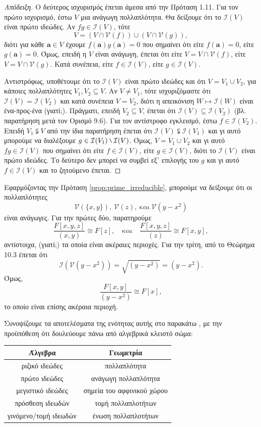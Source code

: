 \documentclass[12pt,a4paper,reqno]{amsart}
\theoremstyle{definition}
\theoremstyle{remark}
\numberwithin{theorem}{section}
\numberwithin{exercise}{section}
\numberwithin{equation}{section}
\newcommand{\iI}{\mathcal{I}}
\newcommand{\vV}{\mathcal{V}}
\newcommand{\bfa}{\pmb{a}}
\newcommand{\mysetminusD}{\hbox{\tikz{\draw[line width=0.6pt,line cap=round] (3pt,0) -- (0,6pt);}}}
\newcommand{\mysetminusT}{\mysetminusD}
\newcommand{\mysetminusS}{\hbox{\tikz{\draw[line width=0.45pt,line cap=round] (2pt,0) -- (0,4pt);}}}
\newcommand{\mysetminusSS}{\hbox{\tikz{\draw[line width=0.4pt,line cap=round] (1.5pt,0) -- (0,3pt);}}}
\newcommand{\sm}{\mathbin{\mathchoice{\mysetminusD}{\mysetminusT}{\mysetminusS}{\mysetminusSS}}}
\begin{document}
\begin{proof}[Απόδειξη]
  Ο δεύτερος ισχυρισμός έπεται άμεσα από την Πρόταση 1.11. Για τον πρώτο ισχυρι\-σμό, έστω $V$ μια ανάγωγη πολλαπλότητα. Θα δείξουμε ότι το $\iI(V)$ είναι πρώτο ιδεώδες. Αν $fg \in \iI(V)$, τότε 
  \[
  V = \left(
    V \cap \vV(f)
  \right) \cup \left(
    V \cap \vV(g)
  \right),
  \]
  διότι για κάθε $\bfa \in V$ έχουμε $f(\bfa)g(\bfa) = 0$ που σημαίνει ότι είτε $f(\bfa) = 0$, είτε $g(\bfa) = 0$. Όμως, επειδή η $V$ είναι ανάγωγη, έπεται ότι είτε $V = V \cap \vV(f)$, είτε $V = V \cap \vV(g)$. Κατά συνέπεια, είτε $f \in \iI(V)$, είτε $g \in \iI(V)$.
  
  Αντιστρόφως, υποθέτουμε ότι το $\iI(V)$ είναι πρώτο ιδεώδες και ότι $V = V_1 \cup V_2$, για κάποιες πολλαπλότητες $V_1, V_2 \subseteq V$. Αν $V \neq V_1$, τότε ισχυριζόμαστε ότι $\iI(V) = \iI(V_2)$ και κατά συνέπεια $V = V_2$, διότι η απεικόνιση $W \mapsto \iI(W)$ είναι ένα-προς-ένα (γιατί;). Πράγματι, επειδή $V_2 \subseteq V$, έπεται ότι $\iI(V) \subseteq \iI(V_2)$ (βλ. παρατήρηση μετά τον Ορισμό 9.6). Για τον αντίστροφο εγκλεισμό, έστω $f \in \iI(V_2)$. Επειδή $V_1 \subsetneqq V$ από την ίδια παρατήρηση έπεται ότι $\iI(V) \subsetneqq \iI(V_1)$ και γι αυτό μπορούμε να διαλέξουμε $g \in \iI(V_1) \sm \iI(V)$. Όμως, $V = V_1 \cup V_2$ και γι αυτό $fg \in \iI(V)$ που σημαίνει ότι είτε $f \in \iI(V)$, είτε $g \in \iI(V)$, διότι το $\iI(V)$ είναι πρώτο ιδεώδες. Το δεύτερο δεν μπορεί να συμβεί εξ' επιλογής του $g$ και γι αυτό $f \in \iI(V)$ και το ζητούμενο έπεται.
\end{proof}

Εφαρμόζοντας την Πρόταση \ref{prop:prime_irreducible}, μπορούμε να δείξουμε ότι οι πολλαπλότητες 
\[     
\vV(\{x,y\}), \ \vV(z), \ \text{και} \ \vV(y-x^2)
\]
είναι ανάγωγες. Για την πρώτες δύο, παρατηρούμε 
\[
\frac{F[x,y,z]}{(x,y)} \cong F[z], \quad \text{και} \quad 
\frac{F[x,y,z]}{(z)} \cong F[x,y],
\]
αντίστοιχα, (γιατί;) τα οποία είναι ακέραιες περιοχές. Για την τρίτη, από το Θεώρημα 10.3 έπεται ότι 
\[
\iI\left(\vV\left(y-x^2\right)\right) = \sqrt{(y-x^2)} = (y-x^2).
\]
Όμως, 
\[
\frac{F[x,y]}{(y-x^2)} \cong F[x],
\]
το οποίο είναι επίσης ακέραια περιοχή.

Συνοψίζουμε τα αποτελέσματα της ενότητας αυτής στο παρακάτω , με την προϋπόθεση ότι δουλεύουμε πάνω από αλγεβρικά κλειστό σώμα:
\begin{table}[H]
\centering
\renewcommand{\arraystretch}{1.3} 
\begin{tabular}{c|c}
\textbf{Άλγεβρα}       & \textbf{Γεωμετρία} \\ \hline
ριζικό ιδεώδες         & πολλαπλότητα \\ \hline 
πρώτο ιδεώδες          & ανάγωγη πολλαπλότητα \\ \hline 
μεγιστικό ιδεώδες      & σημεία του αφφινικού χώρου \\ \hline 
πρόσθεση ιδεωδών       & τομή πολλαπλοτήτων \\ \hline 
γινόμενο/τομή ιδεωδών  & ένωση πολλαπλοτήτων 
\end{tabular}
\end{table}
\noindent
\end{document}
